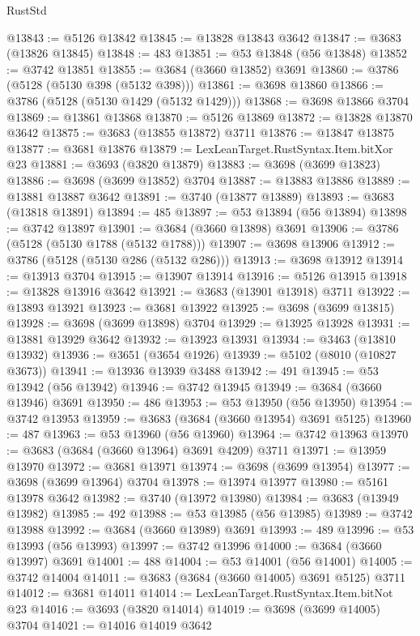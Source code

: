 \begin{lexlean}{RustStd}
\begin{coremodule}
{\begin{coremodule}
{{{{{{{{{{{{{{{{{{{{{{{{{{{{{{{{{{{{{{{{{{{{{{{@13843 := @5126 @13842
@13845 := @13828 @13843 @3642
@13847 := @3683 (@13826 @13845)
@13848 := 483
@13851 := @53 @13848 (@56 @13848)
@13852 := @3742 @13851
@13855 := @3684 (@3660 @13852) @3691
@13860 := @3786 (@5128 (@5130 @398 (@5132 @398)))
@13861 := @3698 @13860
@13866 := @3786 (@5128 (@5130 @1429 (@5132 @1429)))
@13868 := @3698 @13866 @3704
@13869 := @13861 @13868
@13870 := @5126 @13869
@13872 := @13828 @13870 @3642
@13875 := @3683 (@13855 @13872) @3711
@13876 := @13847 @13875
@13877 := @3681 @13876
@13879 := LexLeanTarget.RustSyntax.Item.bitXor @23
@13881 := @3693 (@3820 @13879)
@13883 := @3698 (@3699 @13823)
@13886 := @3698 (@3699 @13852) @3704
@13887 := @13883 @13886
@13889 := @13881 @13887 @3642
@13891 := @3740 (@13877 @13889)
@13893 := @3683 (@13818 @13891)
@13894 := 485
@13897 := @53 @13894 (@56 @13894)
@13898 := @3742 @13897
@13901 := @3684 (@3660 @13898) @3691
@13906 := @3786 (@5128 (@5130 @1788 (@5132 @1788)))
@13907 := @3698 @13906
@13912 := @3786 (@5128 (@5130 @286 (@5132 @286)))
@13913 := @3698 @13912
@13914 := @13913 @3704
@13915 := @13907 @13914
@13916 := @5126 @13915
@13918 := @13828 @13916 @3642
@13921 := @3683 (@13901 @13918) @3711
@13922 := @13893 @13921
@13923 := @3681 @13922
@13925 := @3698 (@3699 @13815)
@13928 := @3698 (@3699 @13898) @3704
@13929 := @13925 @13928
@13931 := @13881 @13929 @3642
@13932 := @13923 @13931
@13934 := @3463 (@13810 @13932)
@13936 := @3651 (@3654 @1926)
@13939 := @5102 (@8010 (@10827 @3673))
@13941 := @13936 @13939 @3488
@13942 := 491
@13945 := @53 @13942 (@56 @13942)
@13946 := @3742 @13945
@13949 := @3684 (@3660 @13946) @3691
@13950 := 486
@13953 := @53 @13950 (@56 @13950)
@13954 := @3742 @13953
@13959 := @3683 (@3684 (@3660 @13954) @3691 @5125)
@13960 := 487
@13963 := @53 @13960 (@56 @13960)
@13964 := @3742 @13963
@13970 := @3683 (@3684 (@3660 @13964) @3691 @4209) @3711
@13971 := @13959 @13970
@13972 := @3681 @13971
@13974 := @3698 (@3699 @13954)
@13977 := @3698 (@3699 @13964) @3704
@13978 := @13974 @13977
@13980 := @5161 @13978 @3642
@13982 := @3740 (@13972 @13980)
@13984 := @3683 (@13949 @13982)
@13985 := 492
@13988 := @53 @13985 (@56 @13985)
@13989 := @3742 @13988
@13992 := @3684 (@3660 @13989) @3691
@13993 := 489
@13996 := @53 @13993 (@56 @13993)
@13997 := @3742 @13996
@14000 := @3684 (@3660 @13997) @3691
@14001 := 488
@14004 := @53 @14001 (@56 @14001)
@14005 := @3742 @14004
@14011 := @3683 (@3684 (@3660 @14005) @3691 @5125) @3711
@14012 := @3681 @14011
@14014 := LexLeanTarget.RustSyntax.Item.bitNot @23
@14016 := @3693 (@3820 @14014)
@14019 := @3698 (@3699 @14005) @3704
@14021 := @14016 @14019 @3642
}}}}}}}}}}}}}}}}}}}}}}}}}}}}}}}}}}}}}}}}}}}}}}}
\end{coremodule}}
\end{coremodule}
\end{lexlean}
